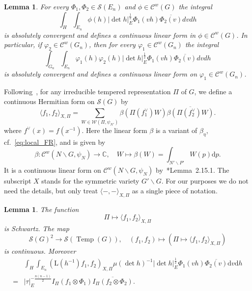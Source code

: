 \documentclass[letterpaper,11pt]{amsart}
\newcommand{\C}{\mathbb{C}}
\newcommand{\cC}{\mathcal{C}}
\newcommand{\cS}{\mathcal{S}}
\newcommand{\cW}{\mathcal{W}}
\newcommand{\rd}{\mathrm{d}}
\newcommand{\bs}{\backslash}
\newcommand{\<}{\negthickspace}
\providecommand{\abs}[1]{\lvert#1\rvert}
\DeclareMathOperator{\Temp}{Temp} \DeclareMathOperator{\temp}{temp}
\theoremstyle{definition}
\theoremstyle{plain}
\newtheorem{lemma}[definition]{Lemma}
\theoremstyle{remark}
\numberwithin{equation}{section}
\begin{document}
\begin{lemma} \label{lemma:linear_convergence}
For every $\Phi_1, \Phi_2 \in \cS(E_n)$ and $\phi \in \cC^w(G)$ the integral
    \begin{equation*}
    \int_{H} \int_{E_n} \phi(h) \abs{\det h}_E^{\frac{1}{2}}
    \Phi_1(vh) \overline{\Phi_2(v)}dv dh
    \end{equation*}
is absolutely convergent and defines a continuous linear form in $\phi \in
\cC^w(G)$. In particular, if $\varphi_2 \in \cC^w(G_n)$, then for every $\varphi_1
\in \cC^w(G_n)$ the integral
    \begin{equation*}
    \int_{G_n} \int_{E_n} \varphi_1(h) \varphi_2(h) \abs{\det h}_E^{\frac{1}{2}}
    \Phi_1(vh) \overline{\Phi_2(v)}dv dh
    \end{equation*}
is absolutely convergent and defines a continuous linear form on $\varphi_1 \in
\cC^w(G_n)$.
\end{lemma}


Following~\cite{BP1}, for any irreducible tempered representation $\Pi$ of
$G$, we define a continuous Hermitian form on $\cS(G)$ by
    \[
    \langle f_1, f_2 \rangle_{X, \Pi} = \sum_{W \in \cW(\Pi, \psi_{N'})}
    \beta(\Pi(f_1^\vee) W) \overline{\beta(\Pi(f_2^\vee) W)}.
    \]
where $f^\vee(x)=f(x^{-1})$. Here the linear form $\beta$ is a variant of
$\beta_\eta$, cf.~\eqref{eq:local_FR}, and is given by
    \[
    \beta: \cC^w(N \bs G, \psi_N) \to \C, \quad W \mapsto
    \beta(W) = \int_{N' \bs P'} W(p) \rd p.
    \]
It is a continuous linear form on $\cC^w(N \bs G, \psi_N)$
by~\cite{BP1}*{Lemma~2.15.1}. The subscript $X$ stands for the symmetric
variety $G' \bs G$. For our purposes we do not need the details, but only
treat $\langle -, -\rangle_{X, \Pi}$ as a single piece of notation.

\begin{lemma}   \label{lemma:lrtf_gl_prep}
The function
    \[
    \Pi \mapsto \langle f_1, f_2 \rangle_{X, \Pi}
    \]
is Schwartz. The map
    \[
    \cS(G)^2 \to \cS(\Temp(G)), \quad
    (f_1, f_2) \mapsto (\Pi \mapsto \langle f_1, f_2 \rangle_{X, \Pi})
    \]
is continuous. Moreover
    \begin{equation}    \label{eq:lrtf_gl_prep}
    \begin{aligned}
    &\int_{H} \int_{E_n} (\mathrm{L}(h^{-1})f_1, f_2 )_{X, \Pi}
    \mu(\det h)^{-1} \abs{\det h}_E^{\frac{1}{2}}
    \Phi_1(vh) \overline{\Phi_2(v)} \rd v \rd h\\ =
    &\abs{\tau}_E^{-\frac{n(n-1)}{2}}
    I_{\Pi}(f_1\otimes \Phi_1) \overline{I_{\Pi}(f_2 \otimes \Phi_2)}.
    \end{aligned}
    \end{equation}
\end{lemma}
\end{document}
